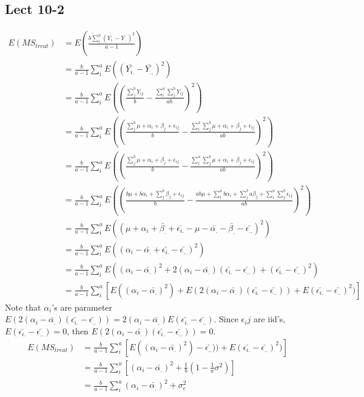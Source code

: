 \documentclass[11pt,letterpaper]{article}
\begin{document}
\subsection*{Lect 10-2}
\begin{align*}
E(MS_{treat}) &= E(\frac{b \sum_i^a (\bar{Y_{i.}} - \bar{Y_{..}})^2}{a-1}) \\
&= \frac{b}{a-1} \sum_i^a E((\bar{Y_{i.}} - \bar{Y_{..}})^2) \\
&= \frac{b}{a-1} \sum_i^a E((\frac{\sum_j^b Y_{ij}}{b} - \frac{\sum_i^a \sum_j^b Y_{ij}}{ab})^2) \\
&= \frac{b}{a-1} \sum_i^a E((\frac{\sum_j^b \mu + \alpha_i + \beta_j + \epsilon_{ij}}{b} - \frac{\sum_i^a \sum_j^b \mu + \alpha_i + \beta_j + \epsilon_{ij}}{ab})^2) \\
&= \frac{b}{a-1} \sum_i^a E((\frac{\sum_j^b \mu + \alpha_i + \beta_j + \epsilon_{ij}}{b} - \frac{\sum_i^a \sum_j^b \mu + \alpha_i + \beta_j + \epsilon_{ij}}{ab})^2) \\
&= \frac{b}{a-1} \sum_i^a E((\frac{b \mu + b \alpha_i + \sum_j^b \beta_j + \epsilon_{ij}}{b} - \frac{ab \mu + \sum_i^a b \alpha_i + \sum_j^b a \beta_j +  \sum_i^a \sum_j^b \epsilon_{ij}}{ab})^2) \\
&= \frac{b}{a-1} \sum_i^a E((\mu + \alpha_i + \bar{\beta_.} + \bar{\epsilon_{i.}}  - \mu - \bar{\alpha_.}  - \bar{\beta_.} - \bar{\epsilon_{..}})^2) \\
&= \frac{b}{a-1} \sum_i^a  E((\alpha_i - \bar{\alpha_.}+ \bar{\epsilon_{i.}} - \bar{\epsilon_{..}}   )^2 )\\
&= \frac{b}{a-1} \sum_i^a  E((\alpha_i - \bar{\alpha_.})^2 + 2 (\alpha_i - \bar{\alpha_.})(\bar{\epsilon_{i.}} - \bar{\epsilon_{..}})  + (\bar{\epsilon_{i.}} - \bar{\epsilon_{..}})^2 ) \\
&= \frac{b}{a-1} \sum_i^a [E((\alpha_i - \bar{\alpha_.})^2) + E(2 (\alpha_i - \bar{\alpha_.})(\bar{\epsilon_{i.}} - \bar{\epsilon_{..}}) )  + E(\bar{\epsilon_{i.}} - \bar{\epsilon_{..}})^2) ]
\end{align*}
\noindent Note that $\alpha_i$'s are parameter $E( 2 (\alpha_i - \bar{\alpha_.})(\bar{\epsilon_{i.}} - \bar{\epsilon_{..}}) ) = 2(\alpha_i - \bar{\alpha_.}) E(\bar{\epsilon_{i.}} - \bar{\epsilon_{..}})$. Since $\epsilon_ij$ are iid's, $E(\bar{\epsilon_{i.}} - \bar{\epsilon_{..}}) = 0$, then $E( 2 (\alpha_i - \bar{\alpha_.})(\bar{\epsilon_{i.}} - \bar{\epsilon_{..}}) ) = 0$.
\begin{align*}
E(MS_{treat}) &= \frac{b}{a-1} \sum_i^a [E((\alpha_i - \bar{\alpha_.})^2) - \bar{\epsilon_{..}}) )  + E(\bar{\epsilon_{i.}} - \bar{\epsilon_{..}})^2) ] \\
&= \frac{b}{a-1} \sum_i^a [(\alpha_i - \bar{\alpha_.})^2 + \frac{1}{b} (1 - \frac{1}{a} \sigma^2)] \\
&= \frac{b}{a-1} \sum_i^a (\alpha_i - \bar{\alpha_.})^2 + \sigma_{\epsilon}^2
\end{align*}
\end{document}
